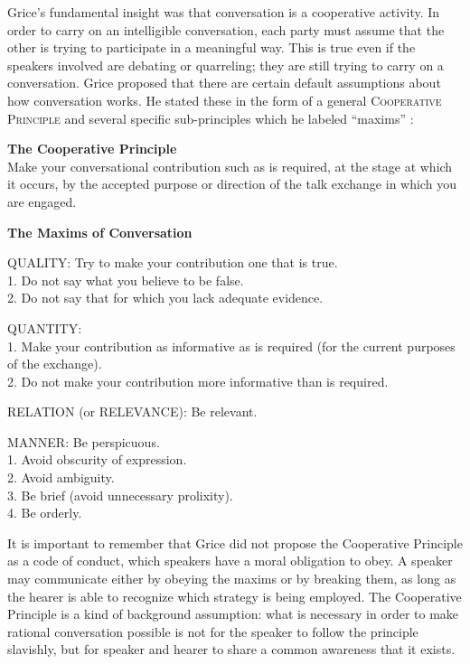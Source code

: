 Grice’s fundamental insight was that conversation is a cooperative activity. In order to carry on an intelligible conversation, each party must assume that the other is trying to participate in a meaningful way. This is true even if the speakers involved are debating or quarreling; they are still trying to carry on a conversation. Grice proposed that there are certain default assumptions about how conversation works. He stated these in the form of a general \textsc{Cooperative Principle}  and several specific sub-principles which he labeled “maxims” :


\begin{stylepoints} \label{ex:8.5}
\textbf{The Cooperative Principle} \citep[45]{Grice1975}\\
Make your conversational contribution such as is required, at the stage at which it occurs, by the accepted purpose or direction of the talk exchange in which you are engaged.
\end{stylepoints}

\begin{stylepoints} \label{ex:8.6}
\textbf{The Maxims of Conversation} \citep[45-46]{Grice1975}

QUALITY: Try to make your contribution one that is true.\\
1. Do not say what you believe to be false.\\
2. Do not say that for which you lack adequate evidence.

QUANTITY:\\
1. Make your contribution as informative as is required (for the current purposes of the exchange).\\
2. Do not make your contribution more informative than is required.

RELATION (or RELEVANCE): Be relevant.
 
MANNER: Be perspicuous.\\
1. Avoid obscurity of expression.\\
2. Avoid ambiguity.\\
3. Be brief (avoid unnecessary prolixity).\\
4. Be orderly.
\end{stylepoints}


It is important to remember that Grice did not propose the Cooperative Principle as a code of conduct, which speakers have a moral obligation to obey. A speaker may communicate either by obeying the maxims or by breaking them, as long as the hearer is able to recognize which strategy is being employed. The Cooperative Principle is a kind of background assumption: what is necessary in order to make rational conversation possible is not for the speaker to follow the principle slavishly, but for speaker and hearer to share a common awareness that it exists.



